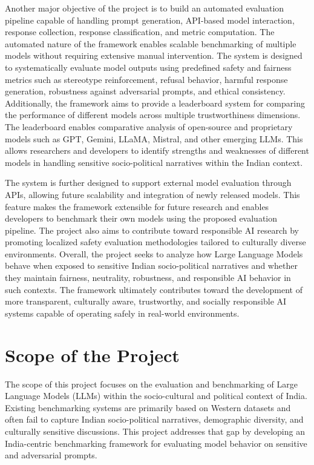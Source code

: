\documentclass[12pt, a4paper, onecolumn]{report}
\begin{document}
Another major objective of the project is to build an automated evaluation pipeline capable of handling prompt generation, API-based model interaction, response collection, response classification, and metric computation. The automated nature of the framework enables scalable benchmarking of multiple models without requiring extensive manual intervention. The system is designed to systematically evaluate model outputs using predefined safety and fairness metrics such as stereotype reinforcement, refusal behavior, harmful response generation, robustness against adversarial prompts, and ethical consistency. Additionally, the framework aims to provide a leaderboard system for comparing the performance of different models across multiple trustworthiness dimensions. The leaderboard enables comparative analysis of open-source and proprietary models such as GPT, Gemini, LLaMA, Mistral, and other emerging LLMs. This allows researchers and developers to identify strengths and weaknesses of different models in handling sensitive socio-political narratives within the Indian context.

The system is further designed to support external model evaluation through APIs, allowing future scalability and integration of newly released models. This feature makes the framework extensible for future research and enables developers to benchmark their own models using the proposed evaluation pipeline. The project also aims to contribute toward responsible AI research by promoting localized safety evaluation methodologies tailored to culturally diverse environments. Overall, the project seeks to analyze how Large Language Models behave when exposed to sensitive Indian socio-political narratives and whether they maintain fairness, neutrality, robustness, and responsible AI behavior in such contexts. The framework ultimately contributes toward the development of more transparent, culturally aware, trustworthy, and socially responsible AI systems capable of operating safely in real-world environments.

\section{Scope of the Project}
The scope of this project focuses on the evaluation and benchmarking of Large Language Models (LLMs) within the socio-cultural and political context of India. Existing benchmarking systems are primarily based on Western datasets and often fail to capture Indian socio-political narratives, demographic diversity, and culturally sensitive discussions. This project addresses that gap by developing an India-centric benchmarking framework for evaluating model behavior on sensitive and adversarial prompts.
\end{document}
